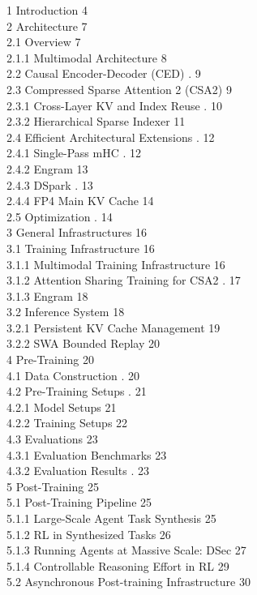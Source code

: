\documentclass[
  10
]{article}
\begin{document}
1 Introduction 4\\
2 Architecture 7\\
2.1 Overview 7\\
2.1.1 Multimodal Architecture 8\\
2.2 Causal Encoder-Decoder (CED) . 9\\
2.3 Compressed Sparse Attention 2 (CSA2) 9\\
2.3.1 Cross-Layer KV and Index Reuse . 10\\
2.3.2 Hierarchical Sparse Indexer 11\\
2.4 Efficient Architectural Extensions . 12\\
2.4.1 Single-Pass mHC . 12\\
2.4.2 Engram 13\\
2.4.3 DSpark . 13\\
2.4.4 FP4 Main KV Cache 14\\
2.5 Optimization . 14\\
3 General Infrastructures 16\\
3.1 Training Infrastructure 16\\
3.1.1 Multimodal Training Infrastructure 16\\
3.1.2 Attention Sharing Training for CSA2 . 17\\
3.1.3 Engram 18\\
3.2 Inference System 18\\
3.2.1 Persistent KV Cache Management 19\\
3.2.2 SWA Bounded Replay 20\\
4 Pre-Training 20\\
4.1 Data Construction . 20\\
4.2 Pre-Training Setups . 21\\
4.2.1 Model Setups 21\\
4.2.2 Training Setups 22\\
4.3 Evaluations 23\\
4.3.1 Evaluation Benchmarks 23\\
4.3.2 Evaluation Results . 23\\
5 Post-Training 25\\
5.1 Post-Training Pipeline 25\\
5.1.1 Large-Scale Agent Task Synthesis 25\\
5.1.2 RL in Synthesized Tasks 26\\
5.1.3 Running Agents at Massive Scale: DSec 27\\
5.1.4 Controllable Reasoning Effort in RL 29\\
5.2 Asynchronous Post-training Infrastructure 30\\
\end{document}
